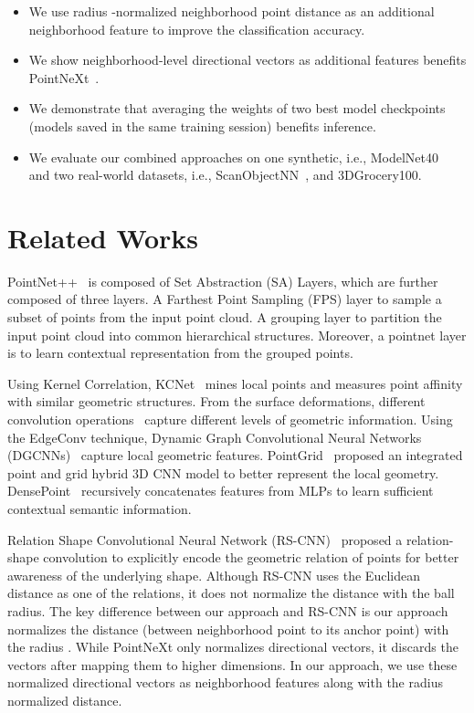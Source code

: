 \documentclass[runningheads]{llncs}
\begin{document}
\begin{itemize}
\item We use radius -normalized neighborhood point distance as an additional neighborhood feature to improve the classification accuracy.
\item We show neighborhood-level directional vectors as additional features benefits PointNeXt~\cite{PointNeXt}.
\item We demonstrate that averaging the weights of two best model checkpoints (models saved in the same training session) benefits inference.
\item We evaluate our combined approaches on one synthetic, i.e., ModelNet40~\cite{wu20153d} and two real-world datasets, i.e., ScanObjectNN~\cite{uy2019revisiting}, and 3DGrocery100. 
\end{itemize}

\section{Related Works}

PointNet++~\cite{qi2017pointnet++} is composed of Set Abstraction (SA) Layers, which are further composed of three layers. A Farthest Point Sampling (FPS) layer to sample a subset of points from the input point cloud. A grouping layer to partition the input point cloud into common hierarchical structures. Moreover, a pointnet layer is to learn contextual representation from the grouped points. 

Using Kernel Correlation, KCNet~\cite{shen2018mining} mines local points and measures point affinity with similar geometric structures. From the surface deformations, different convolution operations~\cite{bronstein2017geometric} capture different levels of geometric information. Using the EdgeConv technique, Dynamic Graph Convolutional Neural Networks (DGCNNs)~\cite{wang2019dynamic} capture local geometric features. 
PointGrid~\cite{le2018pointgrid} proposed an integrated point and grid hybrid 3D CNN model to better represent the local geometry. DensePoint~\cite{liu2019densepoint} recursively concatenates features from MLPs to learn sufficient contextual semantic information. 

Relation Shape Convolutional Neural Network (RS-CNN)~\cite{liu2019relation} proposed a relation-shape convolution to explicitly encode the geometric relation of points for better awareness of the underlying shape. Although RS-CNN uses the Euclidean distance as one of the relations, it does not normalize the distance with the ball radius. The key difference between our approach and RS-CNN is our approach normalizes the distance (between neighborhood point to its anchor point) with the radius . While PointNeXt only normalizes directional vectors, it discards the vectors after mapping them to higher dimensions. In our approach, we use these normalized directional vectors as neighborhood features along with the radius normalized distance.
\end{document}
